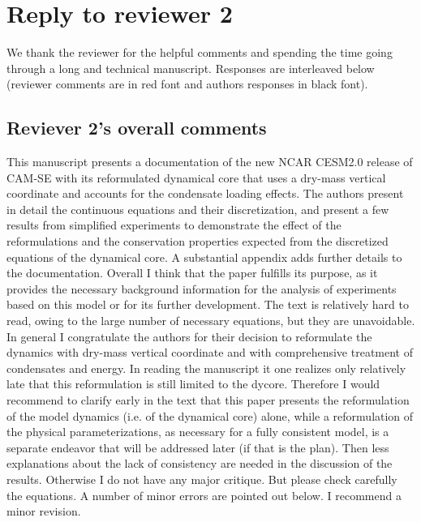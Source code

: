 \documentclass[11pt]{article}
\begin{document}
\section{Reply to reviewer 2}
We thank the reviewer for the helpful comments and spending the time going through a long and technical manuscript. Responses are interleaved below (reviewer comments are in red font and authors responses in black font). 
\subsection{Reviever 2's overall comments}
This manuscript presents a documentation of the new NCAR CESM2.0 release of CAM-SE with its reformulated dynamical core that uses a dry-mass vertical coordinate and accounts for the condensate loading effects. The authors present in detail the continuous equations and their discretization, and present a few results from simplified experiments to demonstrate the effect of the reformulations and the conservation properties expected from the discretized equations of the dynamical core. A substantial appendix adds further details to the documentation. Overall I think that the paper fulfills its purpose, as it provides the necessary background information for the analysis of experiments based on this model or for its further development. The text is relatively hard to read, owing to the large number of necessary equations, but they are unavoidable.
In general I congratulate the authors for their decision to reformulate the dynamics with dry-mass vertical coordinate and with comprehensive treatment of condensates and energy. In reading the manuscript it one realizes only relatively late that this reformulation is still limited to the dycore. Therefore I would recommend to clarify early in the text that this paper presents the reformulation of the model dynamics (i.e. of the dynamical core) alone, while a reformulation of the physical parameterizations, as necessary for a fully consistent model, is a separate endeavor that will be addressed later (if that is the plan). Then less explanations about the lack of consistency are needed in the discussion of the results.
Otherwise I do not have any major critique. But please check carefully the equations. A number of minor errors are pointed out below.
I recommend a minor revision.
\end{document}
